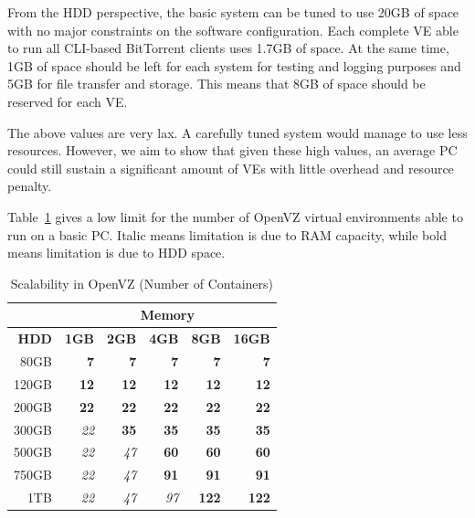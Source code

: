 From the HDD perspective, the basic system can be tuned to use 20GB of space
with no major constraints on the software configuration. Each complete VE able
to run all CLI-based BitTorrent clients uses 1.7GB of space. At the same time,
1GB of space should be left for each system for testing and logging purposes
and 5GB for file transfer and storage. This means that 8GB of space should be
reserved for each VE.

The above values are very lax. A carefully tuned system would manage to use
less resources. However, we aim to show that given these high values, an
average PC could still sustain a significant amount of VEs with little
overhead and resource penalty.

Table~\ref{table:virt-infra:openvz} gives a low limit for the number of OpenVZ
virtual environments able to run on a basic PC. Italic means limitation is due
to RAM capacity, while bold means limitation is due to HDD space.

\begin{table}[ht]
  \centering
  \begin{tabular}{|r|r|r|r|r|r|}
    \hline
     & \multicolumn{5}{|c|}{\textbf{Memory}} \\
    \hline
    \textbf{HDD} & \textbf{1GB} & \textbf{2GB} & \textbf{4GB} & \textbf{8GB} &
    \textbf{16GB} \\
    \hline
    80GB & \textbf{7} & \textbf{7} & \textbf{7} & \textbf{7} &
    \textbf{7} \\
    \hline
    120GB & \textbf{12} & \textbf{12} & \textbf{12} & \textbf{12} &
    \textbf{12} \\
    \hline
    200GB & \textbf{22} & \textbf{22} & \textbf{22} & \textbf{22} &
    \textbf{22} \\
    \hline
    300GB & \textit{22} & \textbf{35} & \textbf{35} & \textbf{35} &
    \textbf{35} \\
    \hline
    500GB & \textit{22} & \textit{47} & \textbf{60} & \textbf{60} &
    \textbf{60} \\
    \hline
    750GB & \textit{22} & \textit{47} & \textbf{91} & \textbf{91} &
    \textbf{91} \\
    \hline
    1TB & \textit{22} & \textit{47} & \textit{97} & \textbf{122} &
    \textbf{122} \\
    \hline
  \end{tabular}
  \caption{Scalability in OpenVZ (Number of Containers)}
  \label{table:virt-infra:openvz}
\end{table}

